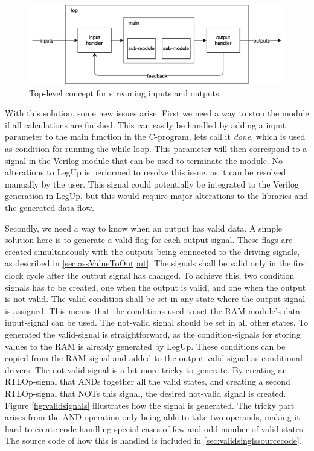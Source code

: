 \begin{figure}[hbpt]
\centering
\includegraphics[width=\textwidth]{../figs/StreamingInputs.png}
\caption{\label{fig:steamininputstop}Top-level concept for streaming inputs and outputs}
\end{figure}

With this solution, some new issues arise. First we need a way to stop the module if all calculations are finished. This can easily be handled by adding a input parameter to the main function in the C-program, lets call it \textit{done}, which is used as condition for running the while-loop. This parameter will then correspond to a signal in the Verilog-module that can be used to terminate the module. No alterations to LegUp is performed to resolve this issue, as it can be resolved manually by the user. This signal could potentially be integrated to the Verilog generation in LegUp, but this would require major alterations to the libraries and the generated data-flow.

Secondly, we need a way to know when an output has valid data. A simple solution here is to generate a valid-flag for each output signal. These flags are created simultaneously with the outputs being connected to the driving signals, as described in \ref{sec:assValueToOutput}. The signals shall be valid only in the first clock cycle after the output signal has changed. To achieve this, two condition signals has to be created, one when the output is valid, and one when the output is not valid. The valid condition shall be set in any state where the output signal is assigned. This means that the conditions used to set the RAM module's data input-signal can be used. The not-valid signal should be set in all other states. To generated the valid-signal is straightforward, as the condition-signals for storing values to the RAM is already generated by LegUp. These conditions can be copied from the RAM-signal and added to the output-valid signal as conditional drivers. The not-valid signal is a bit more tricky to generate. By creating an RTLOp-signal that ANDs together all the valid states, and creating a second RTLOp-signal that NOTs this signal, the desired not-valid signal is created. Figure \ref{fig:validsignals} illustrates how the signal is generated. The tricky part arises from the AND-operation only being able to take two operands, making it hard to create code handling special cases of few and odd number of valid states. The source code of how this is handled is included in \cref{sec:validsinglssourcecode}.

